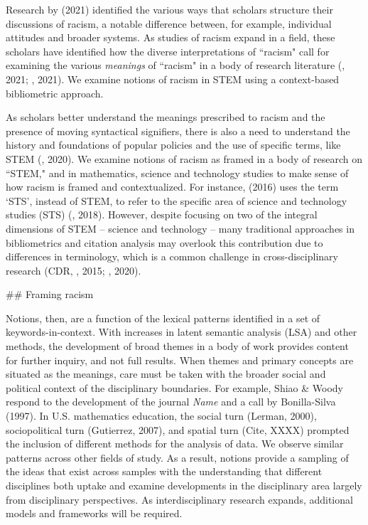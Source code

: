 {{Research by \cite{bonilla2021} (2021) identified the various ways that scholars structure their discussions of racism, a notable difference between, for example, individual attitudes and broader systems. As studies of racism expand in a field, these scholars have identified how the diverse interpretations of ``racism" call for examining the various \textit{meanings} of ``racism" in a body of research literature (\cite{bonilla2021}, 2021; \cite{shiao2021}, 2021). We examine notions of racism in STEM using a context-based bibliometric approach.

As scholars better understand the meanings prescribed to racism and the presence of moving syntactical signifiers, there is also a need to understand the history and foundations of popular policies and the use of specific terms, like STEM (\cite{gil2020stem}, 2020). We examine notions of racism as framed in a body of research on ``STEM," and in mathematics, science and technology studies to make sense of how racism is framed and contextualized. For instance, \cite{benjamin2016catching} (2016) uses the term `STS', instead of STEM, to refer to the specific area of science and technology studies (STS) (\cite{york2018}, 2018). However, despite focusing on two of the integral dimensions of STEM  -- science and technology -- many traditional approaches in bibliometrics and citation analysis may overlook this contribution due to differences in terminology, which is a common challenge in cross-disciplinary research (CDR, \cite{donovan2015your}, 2015; \cite{takeuchi2020transdisciplinarity}, 2020). 

## Framing racism

Notions, then, are a function of the lexical patterns identified in a set of keywords-in-context. With increases in latent semantic analysis (LSA) and other methods, the development of broad themes in a body of work provides content for further inquiry, and not full results. When themes and primary concepts are situated as the meanings, care must be taken with the broader social and political context of the disciplinary boundaries. For example, Shiao \& Woody respond to the development of the journal \textit{Name} and a call by Bonilla-Silva (1997). In U.S. mathematics education, the social turn (Lerman, 2000), sociopolitical turn (Gutierrez, 2007), and spatial turn (Cite, XXXX) prompted the inclusion of different methods for the analysis of data. We observe similar patterns across other fields of study. As a result, notions provide a sampling of the ideas that exist across samples with the understanding that different disciplines both uptake and examine developments in the disciplinary area largely from disciplinary perspectives. As interdisciplinary research expands, additional models and frameworks will be required.

}}

